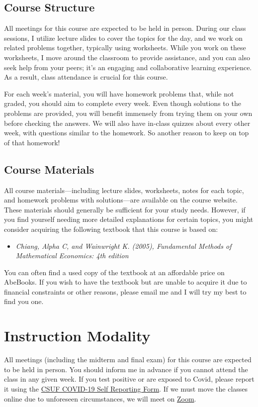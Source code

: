 \documentclass{./../Latex/syllabus}
\begin{document}
\subsection*{Course Structure}

All meetings for this course are expected to be held in person. During our class sessions, I utilize lecture slides to cover the topics for the day, and we work on related problems together, typically using worksheets. While you work on these worksheets, I move around the classroom to provide assistance, and you can also seek help from your peers; it's an engaging and collaborative learning experience. As a result, class attendance is crucial for this course.

For each week's material, you will have homework problems that, while not graded, you should aim to complete every week. Even though solutions to the problems are provided, you will benefit immensely from trying them on your own before checking the answers. We will also have in-class quizzes about every other week, with questions similar to the homework. So another reason to keep on top of that homework!

\subsection*{Course Materials}

All course materials—including lecture slides, worksheets, notes for each topic, and homework problems with solutions—are available on the course website. These materials should generally be sufficient for your study needs. However, if you find yourself needing more detailed explanations for certain topics, you might consider acquiring the following textbook that this course is based on:

\begin{itemize}
  \item \textit{Chiang, Alpha C, and Wainwright K. (2005), Fundamental Methods of Mathematical Economics: 4th edition}
\end{itemize}

You can often find a used copy of the textbook at an affordable price on AbeBooks. If you wish to have the textbook but are unable to acquire it due to financial constraints or other reasons, please email me and I will try my best to find you one.

\section*{Instruction Modality}
All meetings (including the midterm and final exam) for this course are expected to be held in person. You should inform me in advance if you cannot attend the class in any given week. If you test positive or are exposed to Covid, please report it using the \href{https://coronavirus.fullerton.edu/report-covid-19-case-or-exposure/}{CSUF COVID-19 Self Reporting Form}. If we must move the classes online due to unforeseen circumstances, we will meet on \href{https://fullerton.zoom.us/j/81895171931}{Zoom}.
\end{document}
